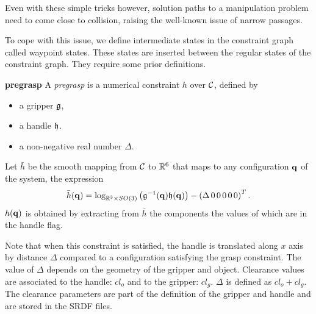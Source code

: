 Even with these simple tricks however, solution paths to a manipulation problem need to come close to collision, raising the well-known issue of narrow passages.

To cope with this issue, we define intermediate states in the
constraint graph called waypoint states. These states are inserted
between the regular states of the constraint graph. They require some prior
definitions.

\begin{definition}\label{def:pregrasp}\textbf{pregrasp}
  A \emph{pregrasp} is a numerical constraint $h$ over $\mathcal{C}$, defined by
  \begin{itemize}
  \item a gripper $\mathfrak{g}$,
  \item a handle $\mathfrak{h}$.
  \item a non-negative real number $\Delta$.
  \end{itemize}
  Let $\bar{h}$ be the smooth mapping from $\mathcal{C}$ to $\mathbb{R}^6$ that maps to any configuration $\mathbf{q}$ of the system, the expression
  \begin{equation}\label{eq:barh-pregrasp}
    \bar{h}(\conf) = \log_{\reals^3\times SO(3)}\left(\gripper^{-1}(\conf) \handle(\conf)\right) - \left(\Delta\, 0\, 0\, 0\, 0\, 0\right)^T.
  \end{equation}
  $h(\mathbf{q})$ is obtained by extracting from $\bar{h}$ the components the values of which are \true in the handle flag.
\end{definition}
Note that when this constraint is satisfied, the handle is translated
along $x$ axis by distance $\Delta$ compared to a configuration
satisfying the grasp constraint. The value of $\Delta$ depends on the geometry
of the gripper and object. Clearance values are associated to the handle: $cl_{o}$ and to the gripper: $cl_{g}$. $\Delta$ is defined as $cl_{o}+cl_{g}$. The
clearance parameters are part of the definition of the gripper and handle and
are stored in the SRDF files.


